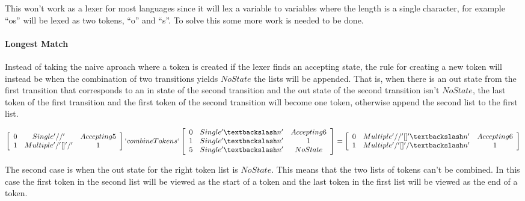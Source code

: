 This won't work as a lexer for most languages since it will lex a variable to
variables where the length is a single character, for example ``os'' will be
lexed as two tokens, ``o'' and ``s''. To solve this some more work is needed to
be done.

\paragraph{Longest Match}\label{longmatch}
Instead of taking the naive aproach where a token is created if the lexer finds an
accepting state, the rule for creating a new token will instead be when the
combination of two transitions yields $NoState$ the lists will be appended. That
is, when there is an out state from the first transition that corresponds to an
in state of the second transition and the out state of the second transition
isn't $NoState$, the last token of the first transition and the first token of
the second transition will become one token, otherwise append the second list to
the first list.
\begin{center}
$\left[\begin{array}{ccc}
0&Single '//'& Accepting 5\\
1&Multiple '/' [] '/' &1\\
\end{array}\right] `combineTokens` 
\left[\begin{array}{ccc}
0&Single '\textbackslash n'&Accepting 6\\
1&Single '\textbackslash n'&1\\
5&Single '\textbackslash n'&NoState\\
\end{array}\right] =
\left[\begin{array}{ccc}
0&Multiple '//' [] '\textbackslash n'&Accepting 6\\
1&Multiple '/' [] '/\textbackslash n'&1\\
\end{array}\right]$
\end{center}
The second case is when the out state for the right token list is $NoState$.
This means that the two lists of tokens can't be combined. In this case the
first token in the second list will be viewed as the start of a token and the
last token in the first list will be viewed as the end of a token.                                                                                               

